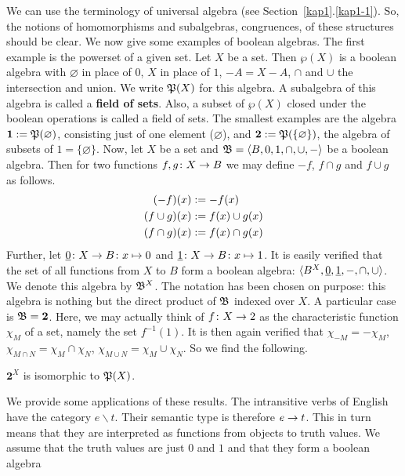We can use the terminology of universal algebra (see
Section~\ref{kap1}.\ref{kap1-1}). So, the notions of homomorphisms and
subalgebras, congruences, of these structures should be clear.
We now give some examples of boolean algebras.  The first example
is the powerset of a given set. Let $X$ be a set.
Then $\wp(X)$ is a boolean algebra with $\varnothing$ in place of
0, $X$ in place of $1$, $- A = X - A$, $\cap$ and $\cup$ the
intersection and union. We write $\mathfrak{P}(X)$ for this algebra.
A subalgebra of this algebra is called a \textbf{field of sets}.
Also, a subset of $\wp(X)$ closed under the boolean operations
is called a field of sets. The smallest examples are the algebra
$\mathbf{1} := \mathfrak{P}(\varnothing)$, consisting just of one element
($\varnothing$), and $\mathbf{2} := \mathfrak{P}(\{\varnothing\})$, the
algebra of subsets of $1 = \{\varnothing\}$. Now, let $X$ be a set
and $\mathfrak{B} = \langle B, 0, 1, \cap, \cup, -\rangle$ be a boolean algebra.
Then for two functions $f, g \colon X \rightarrow B$ we may define $-f$,
$f \cap g$ and $f \cup g$ as follows.
\begin{align}
\notag
(-f)(x) & := - f(x) \\
(f \cup g)(x) & := f(x) \cup g(x) \\
\notag
(f \cap g)(x) & := f(x) \cap g(x)
\end{align}
Further, let $\underline{0} \colon X \rightarrow B \colon x \mapsto 0$ and $\underline{1} \colon
X \rightarrow B \colon x \mapsto 1$. It is easily verified that the set of all
functions from $X$ to $B$ form a boolean algebra: %
$\langle B^X, \underline{0}, \underline{1}, -, \cap, \cup\rangle$. We denote this
algebra by $\mathfrak{B}^X$. 
The notation has been chosen on purpose: this
algebra is nothing but the direct product of $\mathfrak{B}$ indexed over
$X$. A particular case is $\mathfrak{B} = \mathbf{2}$. Here, we may actually
think of $f \colon X \rightarrow 2$ as the characteristic function $\chi_M$ of
a set, namely the set $f^{-1}(1)$. It is then again verified that
$\chi_{-M} = - \chi_M$, $\chi_{M\cap N} = \chi_M \cap \chi_N$,
$\chi_{M \cup N} = \chi_M \cup \chi_N$. So we find the following.
\begin{thm}
$\mathbf{2}^X$ is isomorphic to $\mathfrak{P}(X)$.
\end{thm}
We provide some applications of these results. The intransitive verbs
of English have the category $e\backslash t$. Their semantic type
is therefore $e \rightarrow t$. This in turn means that they are interpreted
as functions from objects to truth values. We assume that the truth
values are just $0$ and $1$ and that they form a boolean algebra
